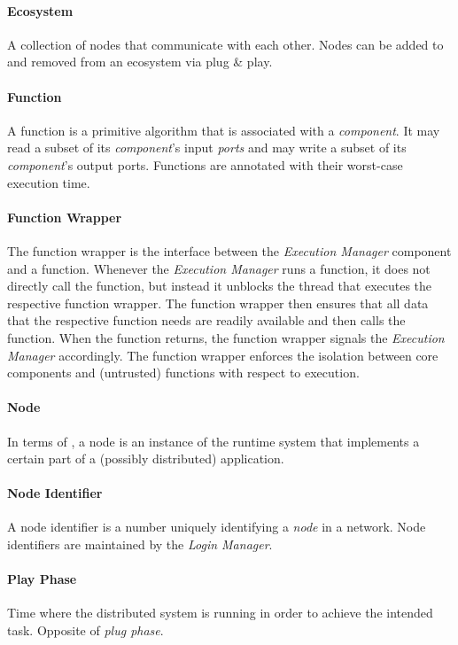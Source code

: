 \paragraph{Ecosystem}
A collection of \xme nodes that communicate with each other.
Nodes can be added to and removed from an \xme ecosystem via plug \& play.

\paragraph{Function}
A function is a primitive algorithm that is associated with a \emph{component}.
It may read a subset of its \emph{component}'s input \emph{ports} and may write a subset of its \emph{component}'s output ports.
Functions are annotated with their worst-case execution time.

\paragraph{Function Wrapper}
The function wrapper is the interface between the \emph{Execution Manager} component and a function.
Whenever the \emph{Execution Manager} runs a function, it does not directly call the function,
but instead it unblocks the thread that executes the respective function wrapper.
The function wrapper then ensures that all data that the respective function needs are readily available and then calls the function.
When the function returns, the function wrapper signals the \emph{Execution Manager} accordingly.
The function wrapper enforces the isolation between \xme core components and (untrusted) functions with respect to execution.

\paragraph{Node}
In terms of \xme, a node is an instance of the \xme runtime system that implements a certain part of a (possibly distributed) application.

\paragraph{Node Identifier}
A node identifier is a number uniquely identifying a \emph{node} in a \xme network.
Node identifiers are maintained by the \emph{Login Manager}.

\paragraph{Play Phase}
Time where the distributed system is running in order to achieve the intended task.
Opposite of \emph{plug phase}.

